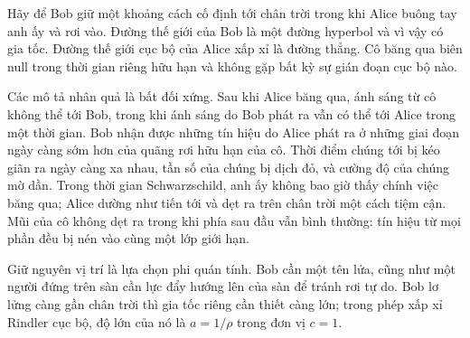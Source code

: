 Hãy để Bob giữ một khoảng cách cố định tới chân trời trong khi Alice buông tay anh ấy và rơi vào. Đường thế giới của Bob là một đường hyperbol và vì vậy có gia tốc. Đường thế giới cục bộ của Alice xấp xỉ là đường thẳng. Cô băng qua biên null trong thời gian riêng hữu hạn và không gặp bất kỳ sự gián đoạn cục bộ nào.

Các mô tả nhân quả là bất đối xứng. Sau khi Alice băng qua, ánh sáng từ cô không thể tới Bob, trong khi ánh sáng do Bob phát ra vẫn có thể tới Alice trong một thời gian. Bob nhận được những tín hiệu do Alice phát ra ở những giai đoạn ngày càng sớm hơn của quãng rơi hữu hạn của cô. Thời điểm chúng tới bị kéo giãn ra ngày càng xa nhau, tần số của chúng bị dịch đỏ, và cường độ của chúng mờ dần. Trong thời gian Schwarzschild, anh ấy không bao giờ thấy chính việc băng qua; Alice dường như tiến tới và dẹt ra trên chân trời một cách tiệm cận. Mũi của cô không dẹt ra trong khi phía sau đầu vẫn bình thường: tín hiệu từ mọi phần đều bị nén vào cùng một lớp giới hạn.

\begin{classroomqa}
\end{classroomqa}

\begin{classroomqa}
\end{classroomqa}

Giữ nguyên vị trí là lựa chọn phi quán tính. Bob cần một tên lửa, cũng như một người đứng trên sàn cần lực đẩy hướng lên của sàn để tránh rơi tự do. Bob lơ lửng càng gần chân trời thì gia tốc riêng cần thiết càng lớn; trong phép xấp xỉ Rindler cục bộ, độ lớn của nó là \(a=1/\rho\) trong đơn vị \(c=1\).

